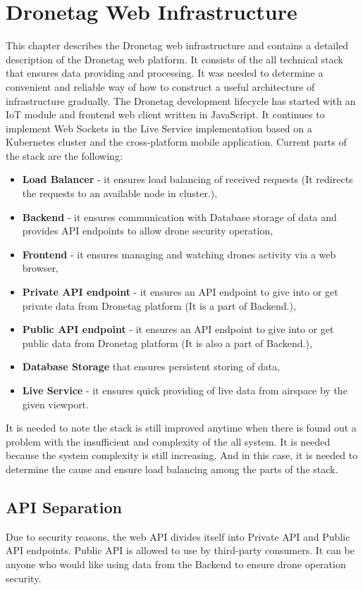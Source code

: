 \chapter{Dronetag Web Infrastructure}\label{ch:dronetag-web-infrastructure}
This chapter describes the Dronetag web infrastructure and contains a detailed description of the Dronetag web platform.
It consists of the all technical stack that ensures data providing and processing.
It was needed to determine a convenient and reliable way of how to construct a useful architecture of infrastructure gradually.
The Dronetag development lifecycle has started with an IoT module and frontend web client written in JavaScript.
It continues to implement Web Sockets in the Live Service implementation based on a Kubernetes cluster and the cross-platform mobile application.
Current parts of the stack are the following:
\begin{itemize}
    \item \textbf{Load Balancer} - it ensures load balancing of received requests (It redirects the requests to an available node in cluster.),
    \item \textbf{Backend} - it ensures communication with Database storage of data and provides API endpoints to allow drone security operation,
    \item \textbf{Frontend} - it ensures managing and watching drones activity via a web browser,
    \item \textbf{Private API endpoint} - it ensures an API endpoint to give into or get private data from Dronetag platform (It is a part of Backend.),
    \item \textbf{Public API endpoint} - it ensures an API endpoint to give into or get public data from Dronetag platform (It is also a part of Backend.),
    \item \textbf{Database Storage} that ensures persistent storing of data,
    \item \textbf{Live Service} - it ensures quick providing of live data from airspace by the given viewport.
\end{itemize}
\newpage
It is needed to note the stack is still improved anytime when there is found out a problem with the insufficient and complexity of the all system.
It is needed because the system complexity is still increasing.
And in this case, it is needed to determine the cause and ensure load balancing among the parts of the stack.

\section{API Separation}\label{sec:api-separation}
Due to security reasons, the web API divides itself into Private API and Public API endpoints.
Public API is allowed to use by third-party consumers.
It can be anyone who would like using data from the Backend to ensure drone operation security.

